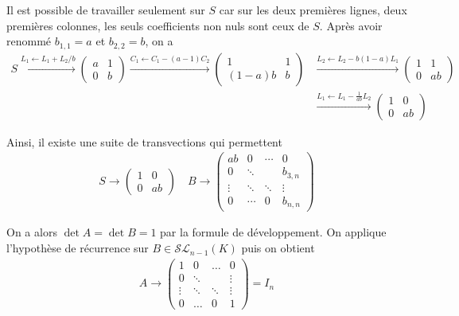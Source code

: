 \documentclass{article}
\begin{document}
Il est possible de travailler seulement sur $S$ car sur les deux premières lignes, deux premières colonnes, les seuls coefficients non nuls sont ceux de $S$. Après avoir renommé $b_{1,1} = a$ et $b_{2,2} = b$, on a
\begin{align*}
S \xrightarrow[]{L_1\leftarrow L_1+L_2/b} \begin{pmatrix}a & 1 \\ 0 & b\end{pmatrix}\xrightarrow[]{C_1\leftarrow C_1-(a-1)C_2}\begin{pmatrix}1 & 1\\
(1-a)b &b\end{pmatrix} &\xrightarrow[]{L_2\leftarrow L_2-b(1-a)L_1}\begin{pmatrix}1 & 1\\0&ab\end{pmatrix}\\
& \xrightarrow[]{L_1\leftarrow L_1-\frac{1}{ab}L_2}\begin{pmatrix}1 & 0\\
0 & ab\end{pmatrix}
\end{align*}

Ainsi, il existe une suite de transvections qui permettent 
\begin{align*}
S \rightarrow \begin{pmatrix} 1 & 0\\ 0 & ab \end{pmatrix}
\quad
B\rightarrow
 \begin{pmatrix}
ab & 0 &\cdots  & 0 \\
0 & \ddots & & b_{3,n} \\
\vdots & \ddots & \ddots & \vdots \\
0 & \cdots & 0 & b_{n,n}
\end{pmatrix}
\end{align*}

On a alors $\det A = \det B = 1$ par la formule de développement. On applique l'hypothèse de récurrence sur $B \in\mathcal{S}\mathcal{L}_{n-1}(K)$ puis on obtient 
\begin{align*}
A\rightarrow \begin{pmatrix}1&0&\ldots &0\\
0& \ddots & & \vdots \\
\vdots &\ddots &\ddots &\vdots\\
0 & \ldots & 0&1\end{pmatrix} = I_n
\end{align*}
\end{document}
